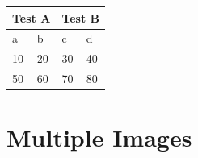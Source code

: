 \documentclass[a4paper,twoside,10pt]{article}
\begin{document}
	\begin{table}
		\begin{tabular}{l|l|l|l}
			\multicolumn{2}{l|}{\textbf{Test A}} & \multicolumn{2}{l}{\textbf{Test B}} \\ \hline
			\cellcolor{blue!25} a &
			\cellcolor{blue!25} b &
			\cellcolor{blue!25} c &
			\cellcolor{blue!25} d \\ \hline
			10     & 20 & 30     & 40 \\
			50     & 60 & 70     & 80 \\
		\end{tabular}
	\end{table}
	\newpage
	
	\section{Multiple Images}
\end{document}
